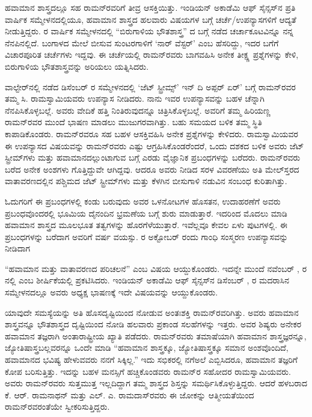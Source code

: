 ಹವಾಮಾನ ಶಾಸ್ತ್ರದಲ್ಲೂ ಸಹ ರಾಮನ್‍ರವರಿಗೆ ತೀವ್ರ ಆಸಕ್ತಿಯಿತ್ತು. ಇಂಡಿಯನ್ ಅಕಾಡೆಮಿ ಆಫ್ ಸೈನ್ಸಸ್‌ನ ಪ್ರತಿ ವಾರ್ಷಿಕ ಸಮ್ಮೇಳನದಲ್ಲಿಯೂ, ಹವಾಮಾನ ಶಾಸ್ತ್ರದ ಹಲವಾರು ವಿಷಯಗಳ ಬಗ್ಗೆ ಚರ್ಚೆ/ಉಪನ್ಯಾಸಗಳಿಗೆ ಆದ್ಯತೆ ನೀಡುತ್ತಿದ್ದರು.  ರ ವಾರ್ಷಿಕ ಸಮ್ಮೇಳನದಲ್ಲಿ “ಬಿರುಗಾಳಿಯ ಭೌತಶಾಸ್ತ್ರ” ದ ಬಗ್ಗೆ ನಡೆದ ಚರ್ಚಾಕೂಟವಿನ್ನೂ ನನ್ನ ನೆನಪಿನಲ್ಲಿದೆ. ಬಂಗಾಳದ ಮೇಲೆ ಬೀಸುವ ಸುಂಟರಗಾಳಿಗೆ ‘ನಾರ್ ವೆಸ್ಟರ್’ ಎಂಬ ಹೆಸರಿದ್ದು, ಇದರ ಬಗೆಗೆ ವಿಚಾರಪೂರಿತ ಚರ್ಚೆಗಳು ಇದ್ದವು. ಈ ಚರ್ಚೆಯಲ್ಲಿ ರಾಮನ್‌ರವರು ಬಾಗವಹಿಸಿ ಅನೇಕ ತೀಕ್ಷ್ಣ ಪ್ರಶ್ನೆಗಳನ್ನು ಕೇಳಿ, ಬಿರುಗಾಳಿಯ ಭೌತಶಾಸ್ತ್ರವನ್ನು ಅರಿಯಲು ಯತ್ನಿಸಿದರು.

ವಾಲ್ಟೇರ್‌ನಲ್ಲಿ ನಡೆದ ಡಿಸೆಂಬರ್  ರ ಸಮ್ಮೇಳನದಲ್ಲಿ ‘ಜೆಟ್ ಸ್ಟ್ರೀಮ್ಸ್’ ಇನ್ ದಿ ಅಪ್ಪರ್ ಏರ್’ ಬಗ್ಗೆ ರಾಮನ್‌ರವರ ತಮ್ಮ ಸಿ. ರಾಮಸ್ವಾಮಿಯವರು ಉಪನ್ಯಾಸ ನೀಡಿದರು. ನಾನು ಇವರ ಉಪನ್ಯಾಸವನ್ನು ಬಹಳ ಚೆನ್ನಾಗಿ ನೆನಪಿಸಿಕೊಳ್ಳಬಲ್ಲೆ. ಅವರು ವೇದಿಕೆ ಹತ್ತಿ ನಿಂತಿರುವುದನ್ನೂ ಚಿತ್ರಿಸಿಕೊಳ್ಳಬಲ್ಲೆ. ಅವರಿಗೆ ತಮ್ಮ ಹಿರಿಯಣ್ಣ ರಾಮನ್‌ರವರ ಮುಂದೆ ಭಾಷಣ ಮಾಡಲು ಮುಜುಗರವಾಗಿತ್ತು. ಬಹು ಸಮಯದ ಬಳಿಕ ತಮ್ಮ ಸ್ಥಿತಿ ಕಾಪಾಡಿಕೊಂಡರು. ರಾಮನ್‌ರವರೂ ಸಹ ಬಹಳ ಆಸಕ್ತಿವಹಿಸಿ ಅನೇಕ ಪ್ರಶ್ನೆಗಳನ್ನು ಕೇಳಿದರು. ರಾಮಸ್ವಾಮಿಯವರ ಈ ಉಪನ್ಯಾಸದ ವಿಷಯವನ್ನು ರಾಮನ್‌ರವರು ಎಷ್ಟು ಆಗ್ರಹಿಸಿಕೊಂಡರೆಂದರೆ, ಒಂದು ದಶಕದ ಬಳಿಕ ಅವರು ಜೆಟ್ ಸ್ಟ್ರೀಮ್‌ಗಳು ಮತ್ತು ಹವಾಮಾನದಲ್ಲುಂಟಾಗುವ  ಬಗ್ಗೆ ಎರಡು ವೈಜ್ಞಾನಿಕ ಪ್ರಬಂಧಗಳನ್ನು ಬರೆದರು. ರಾಮನ್‌ರವರು ಬರೆದ ಅನೇಕ ಅಂಶಗಳು ಗೊತ್ತಿದ್ದುವೇ ಆಗಿದ್ದವು. ಆದರೂ ಅವರು ನೀಡಿದ ಸರಳ ವಿವರಣೆಯು ಅತಿ ಮೇಲ್‌ಸ್ತರದ ವಾತಾವರಣದಲ್ಲಿನ ಪಶ್ಚಿಮದ ಜೆಟ್‌ ಸ್ಟ್ರೀಮ್‌ಗಳು ಮತ್ತು ಕೆಳಗಿನ ಬೀಸುಗಾಳಿ ನಡುವಿನ ಸಂಬಂಧ ಕುರಿತಾಗಿತ್ತು.

ಓದುಗರಿಗೆ ಈ ಪ್ರಬಂಧಗಳಲ್ಲಿ ಕಂಡು ಬರುವುದು ಅವರ ಒಳನೋಟಗಳ ಹೊಸತನ, ಉದಾಹರಣೆಗೆ ಅವರು ಪ್ರಬಂಧವೊಂದರಲ್ಲಿ ಭೂಮಿಯ ದೈನಂದಿನ ಭ್ರಮಣೆಯ ಬಗ್ಗೆ ಶುರು ಮಾಡುತ್ತಾರೆ. ಇದರಿಂದ ಮೊದಲು ಮಾಡಿ ಹವಾಮಾನ ಶಾಸ್ತ್ರದ ಮೂಲಭೂತ ತತ್ವಗಳನ್ನು ಹೊರಗೆಳೆಯುತ್ತಾರೆ. ಇವೆಲ್ಲವೂ ಕೇವಲ ಏಳು ಪುಟಗಳಲ್ಲಿ. ಈ ಪ್ರಬಂಧಗಳನ್ನು ಬರೆದಾಗ ಅವರಿಗೆ  ವರ್ಷ ವಯಸ್ಸು. ರ ಅಕ್ಟೋಬರ್  ರಂದು ಗಾಂಧಿ ಸಂಸ್ಮರಣ ಉಪನ್ಯಾಸವನ್ನು ನೀಡಿದಾಗ 

“ಹವಾಮಾನ ಮತ್ತು ವಾತಾವರಣದ ಪರಿಚಲನೆ” ಎಂಬ ವಿಷಯ ಆಯ್ದುಕೊಂಡರು. ಇದನ್ನೇ ಮುಂದೆ ನವೆಂಬರ್ , ರ  ನಲ್ಲಿ  ಎಂಬ ಶೀರ್ಷಿಕೆಯಲ್ಲಿ ಪ್ರಕಟಿಸಿದರು. ಇಂಡಿಯನ್ ಅಕಾಡೆಮಿ ಆಫ್ ಸೈನ್ಸಸ್‍ನ ಡಿಸೆಂಬರ್ ,  ರ ಮದರಾಸಿನ ಸಮ್ಮೇಳನದಲ್ಲೂ ಅವರು ಅಧ್ಯಕ್ಷ ಭಾಷಣಕ್ಕೆ ಇದೇ ವಿಷಯವನ್ನು ಆಯ್ದುಕೊಂಡರು.

ಯಾವುದೇ ಸಮಸ್ಯೆಯನ್ನು ಅತಿ ಹೊಸದೃಷ್ಟಿಯಿಂದ ನೋಡುವ ಅಂತಃಶಕ್ತಿ ರಾಮನ್‌ರವರಿಗಿತ್ತು. ಅವರು ಹವಾಮಾನ ಶಾಸ್ತ್ರವನ್ನೂ ಭೌತಶಾಸ್ತ್ರದ ದೃಷ್ಟಿಯಿಂದ ನೋಡಿ ಹಲವಾರು ಪ್ರಕಾಂಡ ಸಲಹೆಗಳನ್ನು ಇತ್ತರು. ಅವರ ಶಿಷ್ಯರು ಅನೇಕರ ಹವಾಮಾನ ತಜ್ಞರಾಗಿ ಅಂತಾರಾಷ್ಟ್ರೀಯ ಖ್ಯಾತಿ ಪಡೆದರು. ರಾಮನ್‌ರವರು ತಮಾಷೆಯಾಗಿ ಹವಾಮಾನ ಶಾಸ್ತ್ರಜ್ಞರನ್ನೂ, ಜ್ಯೋತಿಷಾಸ್ತ್ರಬಲ್ಲವರನ್ನೂ ಒಂದೇ ಮಾಡಿ “ಹವಾಮಾನ ಶಾಸ್ತ್ರಕ್ಕೂ, ಜ್ಯೋತಿಷಾಸ್ತ್ರಕ್ಕೂ ಸಮಾನ ಅಂಶವೊಂದಿದೆ, ಹವಾಮಾನದ ಭವಿಷ್ಯ ಹೇಳುವವರು ನನಗೆ ಸಿಕ್ಕಿಲ್ಲ.” ಇದು ಸಭಿಕರಲ್ಲಿ ನಗೆಅಲೆ ಎಬ್ಬಿಸಿದರೂ, ಹವಾಮಾನ ತಜ್ಞರಿಗೆ ಕೋಪ ಬರಿಸುತ್ತಿತ್ತು. ಇದನ್ನು ಬಹಳ ಮನಸ್ಸಿಗೆ ಹಚ್ಚಿಕೊಂಡವರು ರಾಮನ್‌ರ ಸಹೋದರ ರಾಮಸ್ವಾಮಿಯವರು. ಅವರು ರಾಮನ್‌ರವರು ಸುತ್ತಮುತ್ತ ಇಲ್ಲದಿದ್ದಾಗ ತಮ್ಮ ಶಾಸ್ತ್ರದ ಶಿಸ್ತನ್ನು ಸಮರ್ಥಿಸಿಕೊಳ್ಳುತ್ತಿದ್ದರು. ಆದರೆ ಹಳಬರಾದ ಕೆ. ಆರ್. ರಾಮನಾಥನ್ ಮತ್ತು ಎಲ್. ಎ. ರಾಮದಾಸ್‌ರವರು ಈ ಜೋಕನ್ನು ಆತ್ಮೀಯತೆಯಿಂದ ರಾಮನ್‌ರವರಂತೆಯೇ ಸ್ವೀಕರಿಸುತ್ತಿದ್ದರು.

